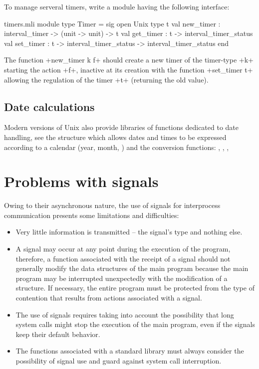\begin{exercise}[noanswer]

To manage serveral timers, write a module having the following interface:
%
\begin{listingcodefile}{timers.mli}
module type Timer = sig
  open Unix
  type t
  val new_timer : interval_timer -> (unit -> unit) -> t
  val get_timer : t -> interval_timer_status
  val set_timer : t -> interval_timer_status -> interval_timer_status
end
\end{listingcodefile}
%

The function \ml+new_timer k f+ should create a new timer of the 
timer-type \ml+k+ starting the action \ml+f+, inactive at its creation with 
the function \ml+set_timer t+ allowing the regulation of the timer \ml+t+ 
(returning the old value). 

\end{exercise}

\subsection* {Date calculations}

Modern versions of Unix also provide libraries of functions dedicated
to date handling, see the structure  which allows
dates and times to be expressed according to a calendar (year, month,
\etc) and the conversion functions: ,
, , \etc

\section{Problems with signals}

Owing to their asynchronous nature, the use of signals for interprocess communication 
presents some limitations and difficulties:
%
\begin{itemize}

\item Very little information is transmitted -- the signal's
type and nothing else.

\item A signal may occur at any point during the execution 
of the program, therefore, a function associated with the receipt 
of a signal should not generally modify the data structures of 
the main program because the main program may be interrupted 
unexpectedly with the modification of a structure.  If necessary,
the entire program must be protected from the type of contention that
results from actions associated with a signal.

\item The use of signals requires taking into account the 
possibility that long system calls might stop the execution of the 
main program, even if the signals keep their default behavior.

\item The functions associated with a standard library must always 
consider the possibility of signal use and guard against system 
call interruption.

\end{itemize}
%

